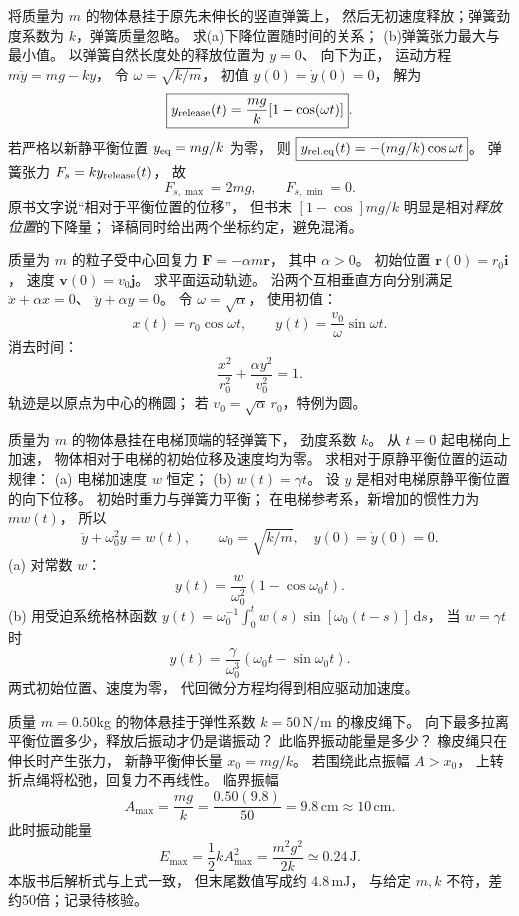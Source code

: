 将质量为 $m$ 的物体悬挂于原先未伸长的竖直弹簧上，
然后无初速度释放；弹簧劲度系数为 $k$，弹簧质量忽略。
求(a)下降位置随时间的关系；
(b)弹簧张力最大与最小值。
\exsolution
以弹簧自然长度处的释放位置为 $y=0$、
向下为正，
运动方程
$m\ddot y=mg-ky$，
令 $\omega=\sqrt{k/m}$，
初值 $y(0)=\dot y(0)=0$，
解为
\[
\boxed{y_{\rm release}(t)=\frac{mg}{k}
[1-\cos(\omega t)]}.
\]
若严格以新静平衡位置 $y_{\rm eq}=mg/k$ 为零，
则
$\boxed{y_{\rm rel.eq}(t)=-(mg/k)\cos\omega t}$。
弹簧张力 $F_s=ky_{\rm release}(t)$，
故
\[
\boxed{F_{s,\max}=2mg,\qquad
F_{s,\min}=0}.
\]
\excheck 原书文字说“相对于平衡位置的位移”，
但书末 $[1-\cos]mg/k$ 明显是相对\emph{释放位置}的下降量；
译稿同时给出两个坐标约定，避免混淆。

质量为 $m$ 的粒子受中心回复力
$\bm F=-\alpha m\bm r$，
其中 $\alpha>0$。
初始位置 $\bm r(0)=r_0\bm i$，
速度 $\bm v(0)=v_0\bm j$。
求平面运动轨迹。
\exsolution
沿两个互相垂直方向分别满足
$\ddot x+\alpha x=0$、
$\ddot y+\alpha y=0$。
令 $\omega=\sqrt\alpha$，
使用初值：
\[
x(t)=r_0\cos\omega t,\qquad
y(t)=\frac{v_0}{\omega}\sin\omega t.
\]
消去时间：
\[
\boxed{\frac{x^2}{r_0^2}+
\frac{\alpha y^2}{v_0^2}=1}.
\]
\excheck 轨迹是以原点为中心的椭圆；
若 $v_0=\sqrt\alpha\,r_0$，特例为圆。

质量为 $m$ 的物体悬挂在电梯顶端的轻弹簧下，
劲度系数 $k$。
从 $t=0$ 起电梯向上加速，
物体相对于电梯的初始位移及速度均为零。
求相对于原静平衡位置的运动规律：
(a) 电梯加速度 $w$ 恒定；
(b) $w(t)=\gamma t$。
\exsolution
设 $y$ 是相对电梯原静平衡位置的向下位移。
初始时重力与弹簧力平衡；
在电梯参考系，新增加的惯性力为 $mw(t)$，
所以
\[
\ddot y+\omega_0^2y=w(t),
\qquad \omega_0=\sqrt{k/m},
\quad y(0)=\dot y(0)=0.
\]
(a) 对常数 $w$：
\[
\boxed{y(t)=\frac w{\omega_0^2}
(1-\cos\omega_0t)}.
\]
(b) 用受迫系统格林函数
$y(t)=\omega_0^{-1}\int_0^t
w(s)\sin[\omega_0(t-s)]\,\mathrm ds$，
当 $w=\gamma t$ 时
\[
\boxed{y(t)=\frac{\gamma}{\omega_0^3}
(\omega_0t-\sin\omega_0t)}.
\]
\excheck 两式初始位置、速度为零，
代回微分方程均得到相应驱动加速度。

质量 $m=0.50$kg 的物体悬挂于弹性系数
$k=50\,\mathrm{N/m}$ 的橡皮绳下。
向下最多拉离平衡位置多少，释放后振动才仍是谐振动？
此临界振动能量是多少？
\exsolution
橡皮绳只在伸长时产生张力，
新静平衡伸长量
$x_0=mg/k$。
若围绕此点振幅 $A>x_0$，
上转折点绳将松弛，回复力不再线性。
临界振幅
\[
\boxed{A_{\max}=\frac{mg}{k}
=\frac{0.50(9.8)}{50}
=9.8\,\mathrm{cm}\approx10\,\mathrm{cm}}.
\]
此时振动能量
\[
\boxed{E_{\max}=\frac12kA_{\max}^2
=\frac{m^2g^2}{2k}\simeq0.24\,\mathrm J}.
\]
\excheck 本版书后解析式与上式一致，
但末尾数值写成约 $4.8\,\mathrm{mJ}$，
与给定 $m,k$ 不符，差约50倍；记录待核验。

